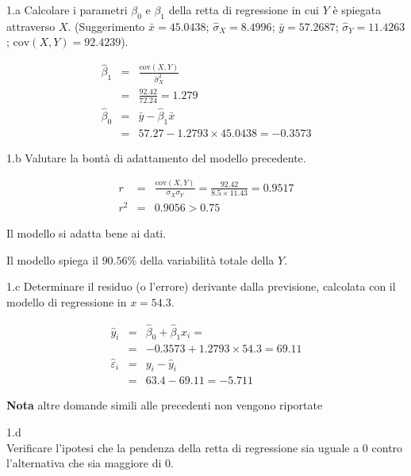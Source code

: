 \documentclass[
  11pt,
]{book}
\theoremstyle{mytheoremstyle}
\theoremstyle{mydefstyle}
\newenvironment{sol}
  {
  \begin{tcolorbox}[enhanced,breakable,arc=0.1mm,boxrule=1pt,colback=white,colframe=iblue,
  title=\bf \fontfamily{lmss}\selectfont \hspace{.5 cm} Soluzione,drop fuzzy shadow]

}{
\end{tcolorbox}
  }
\begin{document}
1.a Calcolare i parametri \(\beta_{0}\) e \(\beta_{1}\)
della retta di regressione in cui \(Y\) è spiegata attraverso \(X\).
(Suggerimento \(\bar{x} = 45.0438\); \(\hat\sigma_{X} = 8.4996\);
\(\bar{y} = 57.2687\); \(\hat\sigma_{Y} = 11.4263\); \(\text{cov}(X,Y)= 92.4239\)).

\begin{sol}
\begin{eqnarray*}
       \hat\beta_1 &=& \frac{\text{cov}(X,Y)}{\hat\sigma_X^2} \\
            &=& \frac{ 92.42 }{ 72.24 }  =  1.279 \\
      \hat\beta_0 &=& \bar y - \hat\beta_1 \bar x\\
          &=&  57.27 - 1.2793 \times  45.0438 = -0.3573 
      \end{eqnarray*}

\end{sol}

1.b Valutare la bontà di adattamento del modello precedente.

\begin{sol}
\begin{eqnarray*}
r&=&\frac{\text{cov}(X,Y)}{\sigma_X\sigma_Y}=\frac{ 92.42 }{ 8.5 \times 11.43 }= 0.9517 \\ 
r^2&=& 0.9056 > 0.75
\end{eqnarray*}

Il modello si adatta bene ai dati.

Il modello spiega il \(90.56\%\) della variabilità totale della \(Y\).

\end{sol}

1.c Determinare il residuo (o l'errore) derivante
dalla previsione, calcolata con il modello di regressione in \(x=54.3\).

\begin{sol}
\begin{eqnarray*}
\hat y_i &=&\hat\beta_0+\hat\beta_1 x_i=\\ 
&=& -0.3573 + 1.2793 \times 54.3 = 69.11 \\ 
\hat \varepsilon_i &=& y_i-\hat y_i\\ 
&=& 63.4 - 69.11 = -5.711  
\end{eqnarray*}

\end{sol}

\textbf{Nota} altre domande simili alle precedenti non vengono riportate

1.d\\
Verificare
l'ipotesi che la pendenza della retta di regressione sia uguale a 0
contro l'alternativa che sia maggiore di 0.
\end{document}
